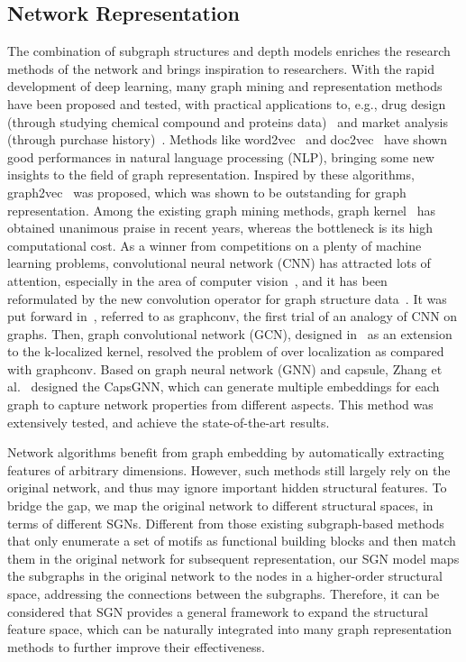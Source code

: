 \documentclass[10pt,journal,compsoc]{IEEEtran}
\begin{document}
\subsection{Network Representation}
The combination of subgraph structures and depth models enriches the research methods of the network and brings inspiration to researchers. With the rapid development of deep learning, many graph mining and representation methods have been proposed and tested, with practical applications to, e.g., drug design (through studying chemical compound and proteins data)~\cite{jing2018deep,lane2018comparing} and market analysis (through purchase history)~\cite{cheng2016wide}. Methods like word2vec~\cite{mikolov2013distributed} and doc2vec~\cite{le2014distributed} have shown good performances in natural language processing (NLP), bringing some new insights to the field of graph representation. Inspired by these algorithms, graph2vec~\cite{narayanan2017graph2vec} was proposed, which was shown to be outstanding for graph representation. Among the existing graph mining methods, graph kernel~\cite{vishwanathan2010graph, shervashidze2011weisfeiler, yanardag2015deep} has obtained unanimous praise in recent years, whereas the bottleneck is its high computational cost. As a winner from competitions on a plenty of machine learning problems, convolutional neural network (CNN) has attracted lots of attention, especially in the area of computer vision~\cite{xuan2018automatic}, and it has been reformulated by the new convolution operator for graph structure data~\cite{duvenaud2015convolutional}. It was put forward in~\cite{bruna2013spectral}, referred to as graphconv, the first trial of an analogy of CNN on graphs. Then, graph convolutional network (GCN), designed in~\cite{defferrard2016convolutional} as an extension to the k-localized kernel, resolved the problem of over localization as compared with graphconv. Based on graph neural network (GNN) and capsule, Zhang et al.~\cite{xinyi2018capsule} designed the CapsGNN, which can generate multiple embeddings for each graph to capture network properties from different aspects. This method was extensively tested, and achieve the state-of-the-art results.

Network algorithms benefit from graph embedding by automatically extracting features of arbitrary dimensions. However, such methods still largely rely on the original network, and thus may ignore important hidden structural features. To bridge the gap, we map the original network to different structural spaces, in terms of different SGNs. Different from those existing subgraph-based methods~\cite{yang2018node,benson2016higher,vohrasubgraph} that only enumerate a set of motifs as functional building blocks and then match them in the original network for subsequent representation, our SGN model maps the subgraphs in the original network to the nodes in a higher-order structural space, addressing the connections between the subgraphs. Therefore, it can be considered that SGN provides a general framework to expand the structural feature space, which can be naturally integrated into many graph representation methods to further improve their effectiveness.
\end{document}
